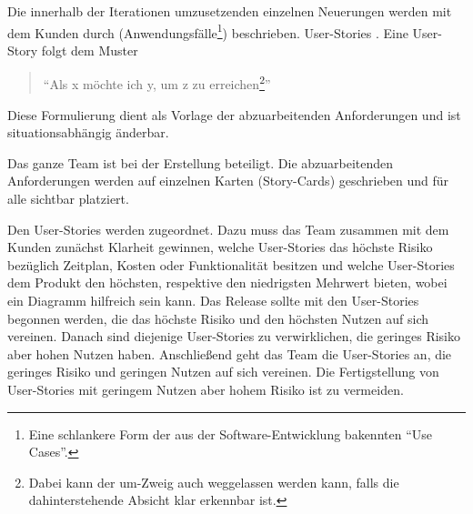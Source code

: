 \documentclass[fontsize=9pt,paper=a4,parskip=half,DIV=11,twocolumn]{scrartcl}
\begin{document}
Die innerhalb der Iterationen umzusetzenden einzelnen Neuerungen werden mit dem
Kunden durch  (Anwendungsfälle\footnote{Eine schlankere Form
der aus der Software-Entwicklung bakennten "`Use Cases"'.}) beschrieben.
User-Stories . Eine User-Story folgt dem Muster 

\begin{quote}
"`Als x möchte ich y, um z zu erreichen\footnote{Dabei kann der um-Zweig auch
weggelassen werden kann, falls die dahinterstehende Absicht klar erkennbar
ist.}"'
\end{quote}

Diese Formulierung dient als Vorlage der abzuarbeitenden
Anforderungen und ist situationsabhängig änderbar.


 

Das ganze Team ist bei der Erstellung beteiligt. Die abzuarbeitenden
Anforderungen werden auf einzelnen Karten (Story-Cards) geschrieben und für alle
sichtbar platziert. 

Den User-Stories werden  zugeordnet. Dazu muss das Team
zusammen mit dem Kunden zunächst Klarheit gewinnen, welche User-Stories das höchste Risiko
bezüglich Zeitplan, Kosten oder Funktionalität besitzen und welche User-Stories
dem Produkt den höchsten, respektive den niedrigsten Mehrwert bieten, wobei ein
Diagramm hilfreich sein kann. Das Release sollte mit den User-Stories begonnen
werden, die das höchste Risiko und den höchsten Nutzen auf sich vereinen. Danach
sind diejenige User-Stories zu verwirklichen, die geringes Risiko aber hohen
Nutzen haben. Anschließend geht das Team die User-Stories an, die geringes Risiko
und geringen Nutzen auf sich vereinen. Die Fertigstellung von User-Stories mit
geringem Nutzen aber hohem Risiko ist zu vermeiden. 
\end{document}
